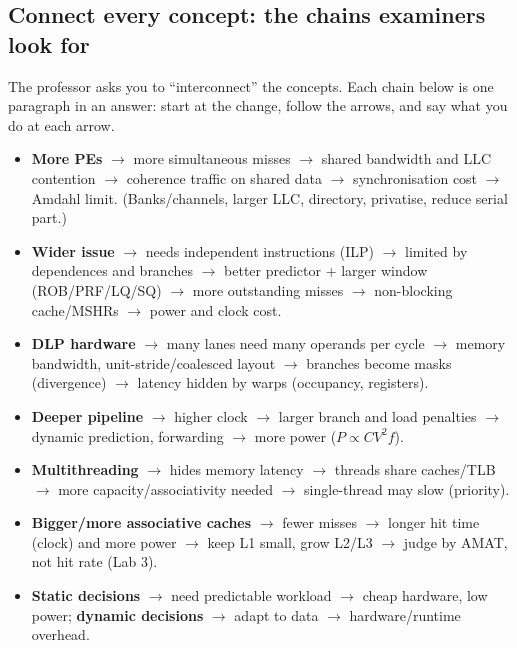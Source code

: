 \subsection{Connect every concept: the chains examiners look for}\label{sec:connect}
The professor asks you to ``interconnect'' the concepts. Each chain below is one paragraph in an answer: start at the change, follow the arrows, and say what you do at each arrow.
\begin{itemize}
\item \textbf{More PEs} $\rightarrow$ more simultaneous misses $\rightarrow$ shared bandwidth and LLC contention $\rightarrow$ coherence traffic on shared data $\rightarrow$ synchronisation cost $\rightarrow$ Amdahl limit. (Banks/channels, larger LLC, directory, privatise, reduce serial part.)
\item \textbf{Wider issue} $\rightarrow$ needs independent instructions (ILP) $\rightarrow$ limited by dependences and branches $\rightarrow$ better predictor + larger window (ROB/PRF/LQ/SQ) $\rightarrow$ more outstanding misses $\rightarrow$ non-blocking cache/MSHRs $\rightarrow$ power and clock cost.
\item \textbf{DLP hardware} $\rightarrow$ many lanes need many operands per cycle $\rightarrow$ memory bandwidth, unit-stride/coalesced layout $\rightarrow$ branches become masks (divergence) $\rightarrow$ latency hidden by warps (occupancy, registers).
\item \textbf{Deeper pipeline} $\rightarrow$ higher clock $\rightarrow$ larger branch and load penalties $\rightarrow$ dynamic prediction, forwarding $\rightarrow$ more power ($P\propto CV^2f$).
\item \textbf{Multithreading} $\rightarrow$ hides memory latency $\rightarrow$ threads share caches/TLB $\rightarrow$ more capacity/associativity needed $\rightarrow$ single-thread may slow (priority).
\item \textbf{Bigger/more associative caches} $\rightarrow$ fewer misses $\rightarrow$ longer hit time (clock) and more power $\rightarrow$ keep L1 small, grow L2/L3 $\rightarrow$ judge by AMAT, not hit rate (Lab 3).
\item \textbf{Static decisions} $\rightarrow$ need predictable workload $\rightarrow$ cheap hardware, low power; \textbf{dynamic decisions} $\rightarrow$ adapt to data $\rightarrow$ hardware/runtime overhead.
\end{itemize}

